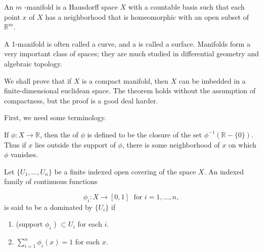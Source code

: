 \begin{definition}
 An \(m\) -manifold is a Hausdorff space \(X\) with a countable basis such that each point \(x\) of \(X\) has a neighborhood that is homeomorphic with an open subset of \(\mathbb{R}^{m}\).
\end{definition}


A 1-manifold is often called a curve, and a  is called a surface. Manifolds form a very important class of spaces; they are much studied in differential geometry \cite{GuilleminPollack1974} and algebraic topology.

We shall prove that if \(X\) is a compact manifold, then \(X\) can be imbedded in a finite-dimensional euclidean space. The theorem holds without the assumption of compactness, but the proof is a good deal harder.

First, we need some terminology.

If \(\phi : X \rightarrow \mathbb{R}\), then the  of \(\phi\) is defined to be the closure of the set \({\phi }^{-1}( {\mathbb{R}-\{ 0\} })\). Thus if \(x\) lies outside the support of \(\phi\), there is some neighborhood of \(x\) on which \(\phi\) vanishes.

\begin{definition}
 Let \(\{ {U_{1},\ldots ,U_{n}}\}\) be a finite indexed open covering of the space \(X\). An indexed family of continuous functions

\[
{\phi }_{i} : X \rightarrow [ {0,1}] \;\text{ for }i = 1,\ldots, n,
\]
is said to be a  dominated by \(\{ U_{i}\}\) if

\begin{enumerate}[itemsep=0.2em, parsep=0pt, topsep=0pt, partopsep=0pt, leftmargin=*, label=(\arabic*), align=left]
\item (support \({\phi }_{i}\) ) \(\subset {U}_{i}\) for each \(i\).
\item \(\mathop{\sum }\limits_{{i = 1}}^{n}{\phi }_{i}(x) = 1\) for each \(x\).
\end{enumerate}
\end{definition}

